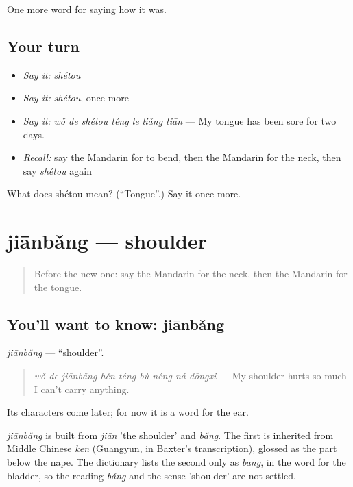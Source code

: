 \begin{grammarlens}[title={What you've built}]
One more word for saying how it was.
\end{grammarlens}

\subsection*{Your turn}
\begin{itemize}
\raggedright
  \item \emph{Say it:} \emph{shétou}
  \item \emph{Say it:} \emph{shétou}, once more
  \item \emph{Say it:} \emph{wǒ de shétou téng le liǎng tiān} — My tongue has been sore for two days.
  \item \emph{Recall:} say the Mandarin for to bend, then the Mandarin for the neck, then say \emph{shétou} again
\end{itemize}

\begin{tcolorbox}[breakable,colback=teal!4,colframe=teal!35!black,title={Before you move on}]
What does shétou mean? (\textquotedblleft{}Tongue\textquotedblright{}.) Say it once more.
\end{tcolorbox}
\section[jiānbǎng]{jiānbǎng — shoulder}

\label{lesson:ZH-C476-jianbang}



\begin{quote}
Before the new one: say the Mandarin for the neck, then the Mandarin for the tongue.
\end{quote}

\subsection*{You'll want to know: jiānbǎng}
\emph{jiānbǎng} — \textquotedblleft{}shoulder\textquotedblright{}.

\begin{quote}
\emph{wǒ de jiānbǎng hěn téng bù néng ná dōngxi} — My shoulder hurts so much I can't carry anything.
\end{quote}

Its characters come later; for now it is a word for the ear.

\begin{cousinweb}
\emph{jiānbǎng} is built from \emph{jiān} 'the shoulder' and \emph{bǎng}. The first is inherited from Middle Chinese \emph{ken} (Guangyun, in Baxter's transcription), glossed as the part below the nape. The dictionary lists the second only as \emph{bang}, in the word for the bladder, so the reading \emph{bǎng} and the sense 'shoulder' are not settled.
\end{cousinweb}

